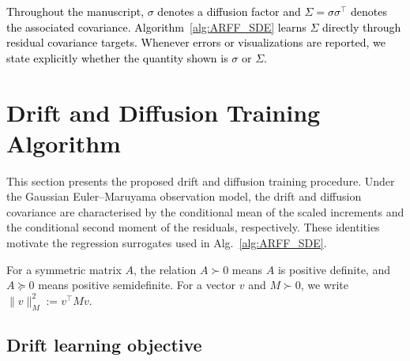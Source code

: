 \documentclass{article}
\begin{document}
\textcolor{black}{Throughout the manuscript, $\sigma$ denotes a diffusion factor and
$\Sigma=\sigma\sigma^\top$ denotes the associated covariance.
Algorithm~\ref{alg:ARFF_SDE} learns $\Sigma$ directly through
residual covariance targets. Whenever errors or visualizations are
reported, we state explicitly whether the quantity shown is
$\sigma$ or $\Sigma$.}

\section{Drift and Diffusion Training Algorithm}\label{sec:training_algorithm}







{\color{black}
This section presents the proposed drift and diffusion training
procedure. Under the Gaussian Euler--Maruyama observation model, the
drift and diffusion covariance are characterised by the conditional
mean of the scaled increments and the conditional second moment of the
residuals, respectively. These identities motivate the regression
surrogates used in Alg.~\ref{alg:ARFF_SDE}.
}

For a symmetric matrix $A$, the relation $A \succ 0$ means $A$ is  positive definite, and $A \succeq 0$ means positive semidefinite. For a vector $v$ and $M \succ 0$, we write $\|v\|_M^2 := v^\top M v$.

\subsection{Drift learning objective}
\label{sec:drift_reduction}
\end{document}
